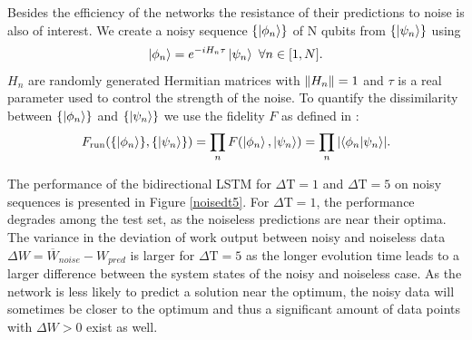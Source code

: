 Besides the efficiency of the networks the resistance of their predictions to noise is also of interest.
We create a noisy sequence $\{\ket{\phi_n}\}$ of N qubits from $\{\ket{\psi_n}\}$ using
\begin{align*}
	\ket{\phi_n} = e^{-i H_n \tau} \ket{\psi_n} \ \forall n \in [1, N].
\end{align*}
$H_n$ are randomly generated Hermitian matrices with $\norm{H_n} = 1$ and $\tau$ is a real parameter used to control the strength of the noise.
To quantify the dissimilarity between $\{\ket{\phi_n}\}$ and $\{\ket{\psi_n}\}$ we use the fidelity $F$ as defined in \cite{10.5555/1972505}:
\begin{align*}
	F_{\text{run}}(\{\ket{\phi_n}\}, \{\ket{\psi_n}\}) = \prod_n F(\ket{\phi_n}, \ket{\psi_n}) = \prod_n \abs{\bra{\phi_n}\ket{\psi_n}}.
\end{align*}

The performance of the bidirectional LSTM for $\Delta \mathrm{T} = 1$ and $\Delta \mathrm{T} = 5$ on noisy sequences is presented in Figure \ref{noisedt5}.
For $\Delta \mathrm{T} = 1$, the performance degrades among the test set, as the noiseless predictions are near their optima.
The variance in the deviation of work output between noisy and noiseless data $\Delta W = \overline{W}_{noise} - W_{pred}$ is larger for $\Delta \mathrm{T} = 5$ as the longer evolution time leads to a larger difference between the system states of the noisy and noiseless case.
As the network is less likely to predict a solution near the optimum, the noisy data will sometimes be closer to the optimum and thus a significant amount of data points with $\Delta W > 0$ exist as well.

